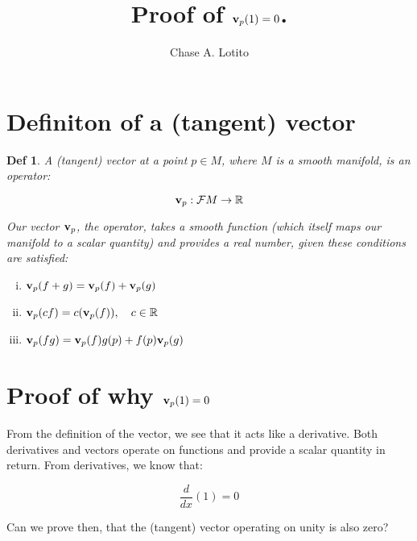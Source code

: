 \documentclass{article}
\title{Proof of \(\vb v_p(1) = 0\).}
\author{Chase A. Lotito}
\newtheorem{definition}{Def}
\begin{document}
\maketitle{}

\section{Definiton of a (tangent) vector}

\begin{definition}

A (tangent) vector at a point \(p \in M\), where \(M\) is a smooth manifold, is an operator:

\begin{equation*}
    \vb v_p : \mathcal{F}M \to \mathbb{R}
\end{equation*}

\noindent
Our vector \(\vb v_p\), the operator, takes a smooth function (which itself maps our manifold to a scalar quantity) and provides a real number, given these conditions are satisfied:

\begin{enumerate}[i.]
    \item \( \vb v_p (f + g) = \vb v_p(f) + \vb v_p(g) \)
    \item \( \vb v_p (cf) = c (\vb v_p(f)), ~~~ c \in \mathbb{R} \)
    \item \( \vb v_p(fg) = \vb v_p(f)g(p) + f(p)\vb v_p(g) \)
\end{enumerate}

\end{definition}


\section{Proof of why \(\vb v_p(1) = 0\)}

From the definition of the vector, we see that it acts like a derivative. Both derivatives and vectors operate on functions and provide a scalar quantity in return. From derivatives, we know that:

\begin{equation*}
    \frac{d}{dx}(1) = 0
    \label{eq:derivative-of-one}
\end{equation*}

\noindent
Can we prove then, that the (tangent) vector operating on unity is also zero?
\end{document}
